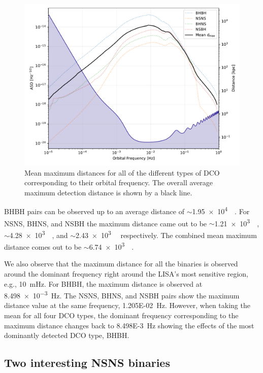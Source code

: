 \documentclass[twocolumn, twocolappendix]{aastex63}
\newcommand{\kpc}{\kilo\parsec}
\newcommand{\scientific}[2]{\SI[scientific-notation=engineering, exponent-to-prefix]{#1}{#2}}
\begin{document}
    \begin{figure}[!h]%
        \centering
        \includegraphics[width=\columnwidth]{analysis_data/004__images_for_latex/d_max}
        \caption{Mean maximum distances for all of the different types of DCO corresponding to their orbital frequency. The overall average maximum detection distance is shown by a black line.}
        \label{fig:dmax}
    \end{figure}%

    BHBH pairs can be observed up to an average distance of $\sim$\scientific{1.95e4}{\kpc}.
    For NSNS, BHNS, and NSBH the maximum distance came out to be $\sim$\scientific{1.21e3}{\kpc}, $\sim$\scientific{4.28e3}{\kpc}, and $\sim$\scientific{2.43e3}{\kpc} respectively.
    The combined mean maximum distance comes out to be $\sim$\scientific{6.74e3}{\kpc}.

    We also observe that the maximum distance for all the binaries is observed around the dominant frequency right around the LISA's most sensitive region, e.g., \scientific{10}{\milli\hertz}.
    For BHBH, the maximum distance is observed at \scientific{8.498e-3}{\hertz}.
    The NSNS, BHNS, and NSBH pairs show the maximum distance value at the same frequency, \scientific{1.205E-02}{\hertz}.
    However, when taking the mean for all four DCO types, the dominant frequency corresponding to the maximum distance changes back to \scientific{8.498E-3}{\hertz} showing the effects of the most dominantly detected DCO type, BHBH\@.

    \subsection{Two interesting NSNS binaries}
    \label{subsec:twointerestingnsnsbinaries}
\end{document}
